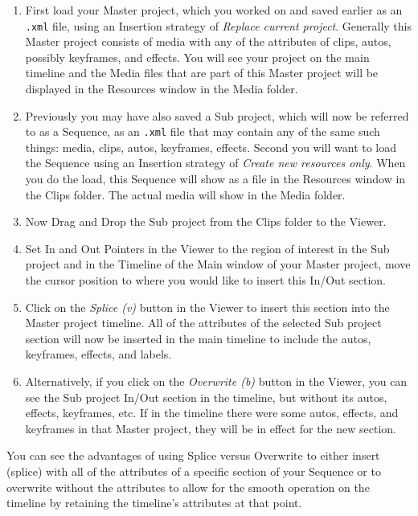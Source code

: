 \begin{enumerate}
\item First load your Master project, which you worked on and
  saved earlier as an \texttt{.xml} file, using an Insertion strategy
  of \textit{Replace current project}.  Generally this Master project
  consists of media with any of the attributes of clips, autos,
  possibly keyframes, and effects.  You will see your project on the
  main timeline and the Media files that are part of this Master
  project will be displayed in the Resources window in the Media
  folder.
\item Previously you may have also saved a Sub project, which
  will now be referred to as a Sequence, as an \texttt{.xml} file that
  may contain any of the same such things: media, clips, autos,
  keyframes, effects.  Second you will want to load the Sequence using
  an Insertion strategy of \textit{Create new resources only}.  When
  you do the load, this Sequence will show as a file in the Resources
  window in the Clips folder.  The actual media will show in the Media
  folder.
\item Now Drag and Drop the Sub project from the Clips folder to
  the Viewer.
\item Set In and Out Pointers in the Viewer to the region of
  interest in the Sub project and in the Timeline of the Main window
  of your Master project, move the cursor position to where you would
  like to insert this In/Out section.
\item Click on the \textit{Splice (v)} button in the Viewer to
  insert this section into the Master project timeline.  All of the
  attributes of the selected Sub project section will now be inserted
  in the main timeline to include the autos, keyframes, effects, and
  labels.
\item Alternatively, if you click on the \textit{Overwrite (b)}
  button in the Viewer, you can see the Sub project In/Out section in
  the timeline, but without its autos, effects, keyframes, etc.  If in
  the timeline there were some autos, effects, and keyframes in that
  Master project, they will be in effect for the new section.
\end{enumerate}

You can see the advantages of using Splice versus Overwrite to
either insert (splice) with all of the attributes of a specific
section of your Sequence or to overwrite without the attributes to
allow for the smooth operation on the timeline by retaining the
timeline’s attributes at that point.

